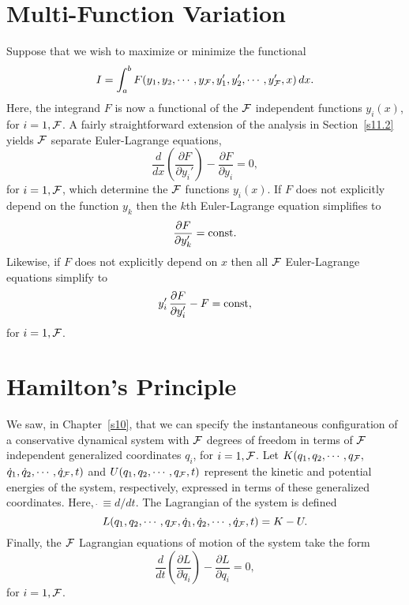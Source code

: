\section{Multi-Function Variation}\label{s11.4}
Suppose that we wish to maximize or minimize the functional
\begin{equation}
I = \int_a^b F(y_1,y_2,\cdots,y_{\cal F},y_1',y_2',\cdots,y_{\cal F}',x)\,dx.
\end{equation}
Here, the integrand $F$ is now a functional of the ${\cal F}$ independent
functions $y_i(x)$, for $i=1,{\cal F}$. A fairly straightforward extension of the
analysis in Section~\ref{s11.2} yields ${\cal F}$ separate Euler-Lagrange equations,
\begin{equation}\label{e11.34}
\frac{d}{dx}\!\left(\frac{\partial F}{\partial y_i'}\right)-\frac{\partial F}{\partial y_i} = 0,
\end{equation}
for $i=1,{\cal F}$, which determine the ${\cal F}$ functions $y_i(x)$. If $F$ does not
explicitly depend on the function $y_k$ then the $k$th Euler-Lagrange
equation simplifies to
\begin{equation}
\frac{\partial F}{\partial y_k'} = {\rm const}.
\end{equation}
Likewise, if $F$ does not explicitly depend on $x$ then all ${\cal F}$ Euler-Lagrange equations simplify to
\begin{equation}
y_i'\,\frac{\partial F}{\partial y_i'} - F = {\rm const},
\end{equation}
for $i=1,{\cal F}$. 

\section{Hamilton's Principle}
We saw, in Chapter~\ref{s10}, that  we can specify the instantaneous configuration of a conservative dynamical system
with ${\cal F}$ degrees of freedom  in terms of ${\cal F}$ independent generalized coordinates $q_i$, for
$i=1,{\cal F}$.  Let $K(q_1,q_2,\cdots,q_{\cal F},$
 $\dot{q}_1,\dot{q}_2,\cdots,\dot{q}_{\cal F},t)$ and
$U(q_1,q_2,\cdots,q_{\cal F},t)$ represent the kinetic and potential energies of the
system, respectively, expressed in terms of these generalized coordinates.
Here, $\dot{~}\equiv d/dt$. 
The Lagrangian of the system is defined
\begin{equation}
L(q_1,q_2,\cdots,q_{\cal F}, \dot{q}_1,\dot{q}_2,\cdots,\dot{q}_{\cal F},t) = K - U.
\end{equation}
Finally, the ${\cal F}$ Lagrangian equations of motion of the system take the form
\begin{equation}\label{e11.38}
\frac{d}{dt}\!\left(\frac{\partial L}{\partial \dot{q}_i}\right)-\frac{\partial L}{\partial q_i} = 0,
\end{equation}
for $i=1,{\cal F}$. 


